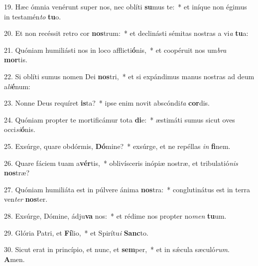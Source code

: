 19. Hæc ómnia venérunt super nos, nec oblíti \textbf{su}mus te:~*  et iníque non égimus in testamén\textit{to} \textbf{tu}o.\

20. Et non recéssit retro cor \textbf{nos}trum:~*  et declinásti sémitas nostras a vi\textit{a} \textbf{tu}a:\

21. Quóniam humiliásti nos in loco afflicti\textbf{ó}nis,~*  et coopéruit nos um\textit{bra} \textbf{mor}tis.\

22. Si oblíti sumus nomen Dei \textbf{nos}tri,~*  et si expándimus manus nostras ad deum a\textit{li}\textbf{é}num:\

23. Nonne Deus requíret \textbf{is}ta?~*  ipse enim novit abscóndi\textit{ta} \textbf{cor}dis.\

24. Quóniam propter te mortificámur tota \textbf{di}e:~*  æstimáti sumus sicut oves occi\textit{si}\textbf{ó}nis.\

25. Exsúrge, quare obdórmis, \textbf{Dó}mine?~*  exsúrge, et ne repéllas \textit{in} \textbf{fi}nem.\

26. Quare fáciem tuam a\textbf{vér}tis,~*  oblivísceris inópiæ nostræ, et tribulatió\textit{nis} \textbf{nos}træ?\

27. Quóniam humiliáta est in púlvere ánima \textbf{nos}tra:~*  conglutinátus est in terra ven\textit{ter} \textbf{nos}ter.\

28. Exsúrge, Dómine, ádju\textbf{va} nos:~*  et rédime nos propter no\textit{men} \textbf{tu}um.\

29. Glória Patri, et \textbf{Fí}lio,~*  et Spirítu\textit{i} \textbf{Sanc}to.\

30. Sicut erat in princípio, et nunc, et \textbf{sem}per,~*  et in sǽcula sæculó\textit{rum}. \textbf{A}men.\

